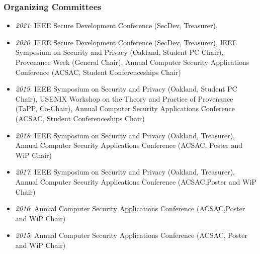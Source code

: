 \hypertarget{organizing-committees}{%
\subsubsection{Organizing Committees}\label{organizing-committees}}
\begin{itemize}
\tightlist
\item
  \emph{2021}: IEEE Secure Development Conference (SecDev, Treasurer),
\item
  \emph{2020}: IEEE Secure Development Conference (SecDev, Treasurer),
  IEEE Symposium on Security and Privacy (Oakland, Student PC Chair),
  Provenance Week (General Chair), Annual Computer Security Applications Conference (ACSAC, Student Conferenceships Chair)
\item
  \emph{2019}: IEEE Symposium on Security and Privacy (Oakland, Student PC Chair),
  USENIX Workshop on the Theory and Practice of Provenance (TaPP, Co-Chair),
  Annual Computer Security Applications Conference (ACSAC, Student Conferenceships Chair)
\item
  \emph{2018}: IEEE Symposium on Security and Privacy (Oakland, Treasurer),
  Annual Computer Security Applications Conference (ACSAC, Poster and WiP Chair)
\item
  \emph{2017}: IEEE Symposium on Security and Privacy (Oakland, Treasurer),
  Annual Computer Security Applications Conference (ACSAC,Poster and WiP Chair)
\item
  \emph{2016}: Annual Computer Security Applications Conference (ACSAC,Poster and WiP Chair)
\item
  \emph{2015}: Annual Computer Security Applications Conference (ACSAC, Poster and WiP Chair)
\end{itemize}

